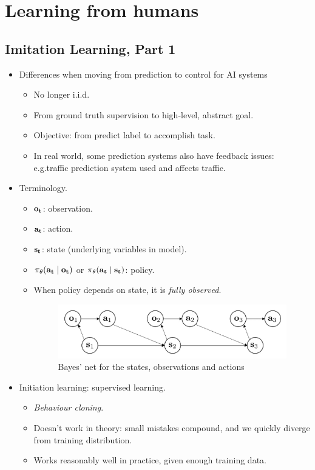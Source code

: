 
\chapter{Learning from humans}

\section{Imitation Learning, Part 1}

\begin{itemize}
    \item Differences when moving from prediction to control for AI systems
    \begin{itemize}
        \item No longer i.i.d.
        \item From ground truth supervision to high-level, abstract goal.
        \item Objective: from predict label to accomplish task.
        \item In real world, some prediction systems also have feedback issues: e.g.\@ traffic prediction system used and affects traffic.
    \end{itemize}
    \item Terminology.
    \begin{itemize}
        \item $\bf o_t$: observation.
        \item $\bf a_t$: action.
        \item $\bf s_t$: state (underlying variables in model).
        \item $\pi_\theta(\bf a_t \mid \bf o_t)$ or $\pi_\theta(\bf a_t \mid \bf s_t)$: policy.
        \item When policy depends on state, it is \emph{fully observed}.
        \begin{figure}[h!]
            \centering
            \includegraphics[width=.95\linewidth]{images/state-bayes-net.png}
            \caption{Bayes' net for the states, observations and actions}
            \label{fig:bayes net states}
        \end{figure}
    \end{itemize}
    \item Initiation learning: supervised learning.
    \begin{itemize}
        \item \emph{Behaviour cloning}.
        \item Doesn't work in theory: small mistakes compound, and we quickly diverge from training distribution.
        \item Works reasonably well in practice, given enough training data.
    \end{itemize}
\end{itemize}